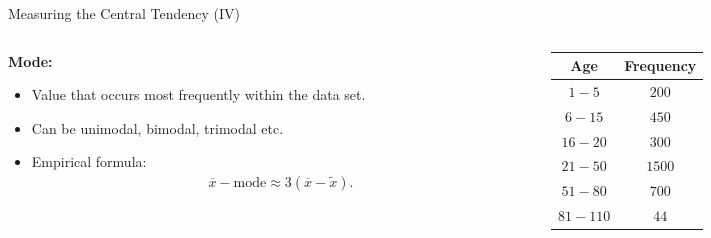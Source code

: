 \begin{frame}{Measuring the Central Tendency (IV)}
	\begin{columns}
		\begin{column}{0.6\textwidth}
			\textbf{Mode:}
			\begin{itemize}[noitemsep]
				\item Value that occurs most frequently within the data set.
				\item Can be unimodal, bimodal, trimodal etc.
				\item Empirical formula:
				      \begin{align}
					      \overline{x} - \text{mode} \approx 3(\overline{x}- \tilde{x}).
				      \end{align}
			\end{itemize}
		\end{column}
		\begin{column}{0.3\textwidth}  %
			\begin{table}
				\begin{tabular}{|c|c|}
					Age      & Frequency \\ \hline
					$1-5$    & $200$     \\
					$6-15$   & $450$     \\
					$16-20$  & $300$     \\
					$21-50$  & $1500$    \\
					$51-80$  & $700$     \\
					$81-110$ & $44$
				\end{tabular}\\[0.5cm]
			\end{table}
		\end{column}
	\end{columns}
\end{frame}

